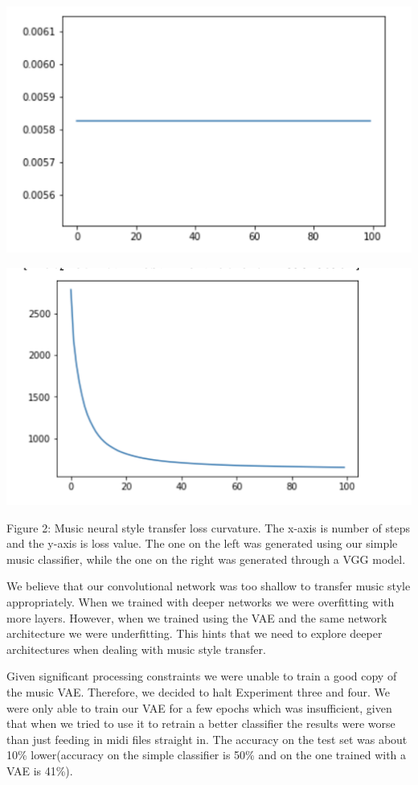 \documentclass{article}
\begin{document}
\centerline{\includegraphics[width=\columnwidth]{flatline}}
\centerline{\includegraphics[width=\columnwidth]{curvedline}}

Figure 2: Music neural style transfer loss curvature. The x-axis is number of steps and the y-axis is loss value. The one on the left was generated using our simple music classifier, while the one on the right was generated through a VGG model. 

We believe that our convolutional network was too shallow to transfer music style appropriately. When we trained with deeper networks we were overfitting with more layers. However, when we trained using the VAE and the same network architecture we were underfitting. This hints that we need to explore deeper architectures when dealing with music style transfer. 


Given significant processing constraints we were unable to train a good copy of the music VAE. Therefore, we decided to halt Experiment three and four. We were only able to train our VAE for a few epochs which was insufficient, given that when we tried to use it to retrain a better classifier the results were worse than just feeding in midi files straight in. The accuracy on the test set was about 10\% lower(accuracy on the simple classifier is 50\% and on the one trained with a VAE is 41\%). 
\end{document}
